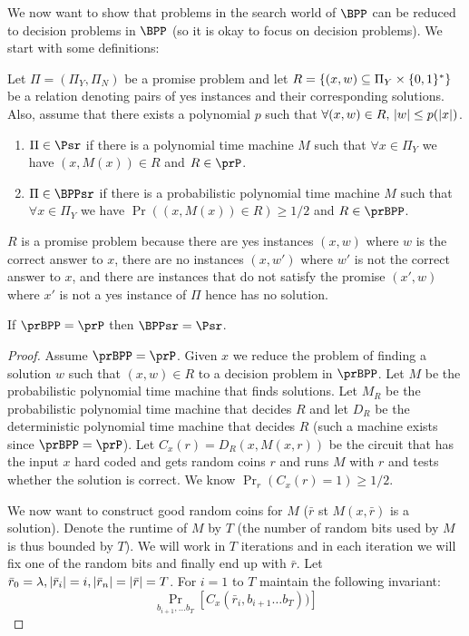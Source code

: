 We now want to show that problems in the search world of $\BPP$ can be reduced to decision problems in $\BPP$ (so it is okay to focus on decision problems). We start with some definitions:

\begin{definition}
	Let $\Pi = (\Pi_Y,\Pi_N)$ be a promise problem and let $R=\{ (x,w) \subseteq \Pi_Y \times \{0,1\}^* \}$ be a relation denoting pairs of yes instances and their corresponding solutions. Also, assume that there exists a polynomial $p$ such that $\forall (x,w) \in R, \, \lvert w\rvert \leq p(\lvert x\rvert)$.
	
	\begin{enumerate}
		\item $\Pi \in \Psr$ if there is a polynomial time machine $M$ such that $\forall x \in \Pi_Y$ we have $(x, M(x)) \in R$ and $R \in \prP$.
		\item $\Pi \in \BPPsr$ if there is a probabilistic polynomial time machine $M$ such that $\forall x \in \Pi_Y$ we have $\Pr( (x, M(x)) \in R) \geq 1/2$ and $R \in \prBPP$.		
	\end{enumerate}
\end{definition}

$R$ is a promise problem because there are yes instances $(x,w)$ where $w$ is the correct answer to $x$, there are no instances $(x,w')$ where $w'$ is not the correct answer to $x$, and there are instances that do not satisfy the promise $(x',w)$ where $x'$ is not a yes instance of $\Pi$ hence has no solution.

\begin{theorem}
	If $\prBPP = \prP$ then $\BPPsr = \Psr$.
\end{theorem}
\begin{proof}
	Assume $\prBPP=\prP$. Given $x$ we reduce the problem of finding a solution $w$ such that $(x,w) \in R$ to a decision problem in $\prBPP$. Let $M$ be the probabilistic polynomial time machine that finds solutions. Let $M_R$ be the probabilistic polynomial time machine that decides $R$ and let $D_R$ be the deterministic polynomial time machine that decides $R$ (such a machine exists since $\prBPP=\prP$). 
	Let $C_x(r)= D_R(x, M(x,r))$ be the circuit that has the input $x$ hard coded and gets random coins $r$ and runs $M$ with $r$ and tests whether the solution is correct. We know $\Pr_r(C_x(r)=1) \geq 1/2$.
	
	We now want to construct good random coins for $M$ ($\bar{r}$ st $M(x,\bar{r})$ is a solution). Denote the runtime of $M$ by $T$ (the number of random bits used by $M$ is thus bounded by $T$). We will work in $T$ iterations and in each iteration we will fix one of the random bits and finally end up with $\bar{r}$. Let $\bar{r}_0 = \lambda, \lvert\bar{r}_i\rvert=i, \lvert\bar{r}_n\rvert = \lvert\bar{r}\rvert = T$.
	For $i=1$ to $T$ maintain the following invariant:
	\[
		\Pr_{b_{i+1},\ldots b_T}[C_x(\bar{r}_i, b_{i+1} \ldots b_T))]
	\]
	
	
\end{proof}

